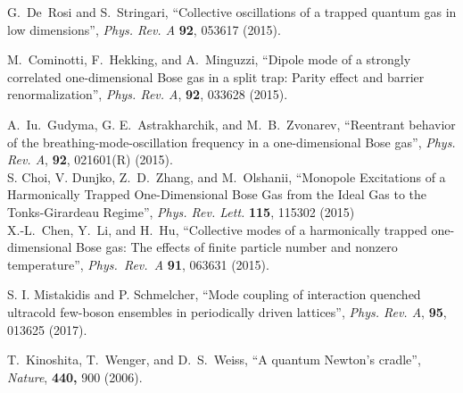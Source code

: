 \documentclass[a4paper, onecolumn]{revtex4-1}
\begin{document}
\begin{thebibliography}{1}




G.~De~Rosi and S.~Stringari, ``Collective oscillations of a trapped quantum gas in low dimensions'', 
{\em Phys. Rev. A} {\bf 92}, 053617 (2015).


 M.~Cominotti, F.~Hekking, and A.~Minguzzi, 
``Dipole mode of a strongly correlated one-dimensional Bose gas in a split trap: Parity effect and
barrier renormalization'', 
{\em Phys. Rev. A}, {\bf 92}, 033628 (2015). 
  
A.~Iu.~Gudyma, G. E.~Astrakharchik, and M.~B.~Zvonarev, ``Reentrant behavior of the
breathing-mode-oscillation frequency in a one-dimensional Bose gas'', 
{\em Phys. Rev. A}, \textbf{92}, 021601(R) (2015). 
%
\\ 
%
S. Choi, V. Dunjko, Z.~D.~Zhang, and M.~Olshanii,
``Monopole Excitations of a Harmonically Trapped One-Dimensional Bose Gas from the Ideal Gas to the
Tonks-Girardeau Regime'', 
{\em Phys. Rev. Lett.} \textbf{115}, 115302 (2015)
%
\\
%
X.-L.~Chen, Y.~Li, and H.~Hu, 
``Collective modes of a harmonically trapped one-dimensional Bose gas: The effects of finite particle
number and nonzero temperature'', 
{\em Phys.\ Rev.\ A} \textbf{91}, 063631 (2015).  



S. I. Mistakidis and P. Schmelcher, 
``Mode coupling of interaction quenched ultracold few-boson ensembles in periodically driven
lattices'', 
{\em Phys. Rev. A}, {\bf 95}, 013625 (2017). 





T.~Kinoshita, T.~Wenger, and D.~S.~Weiss, ``A quantum Newton's cradle'', {\em Nature}, {\bf 440,} 900 (2006). 


\end{thebibliography}
\end{document}
